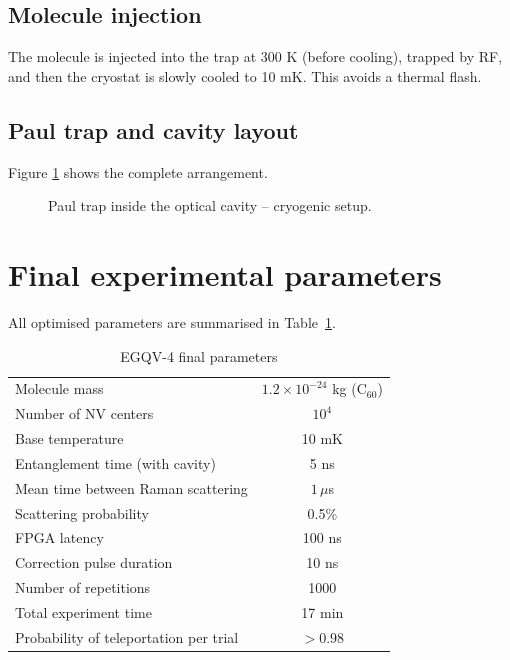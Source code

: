 \documentclass[12pt,a4paper]{article}
\begin{document}
\subsection{Molecule injection}
The molecule is injected into the trap at 300 K (before cooling), trapped by RF, and then the cryostat is slowly cooled to 10 mK. This avoids a thermal flash.

\subsection{Paul trap and cavity layout}
Figure \ref{fig:setup} shows the complete arrangement.

\begin{figure}[h]
\centering
{}
\caption{Paul trap inside the optical cavity – cryogenic setup.}
\label{fig:setup}
\end{figure}

\section{Final experimental parameters}
All optimised parameters are summarised in Table~\ref{tab:params}.

\begin{table}[h]
\centering
\caption{EGQV-4 final parameters}
\label{tab:params}
\begin{tabular}{|l|c|}
\hline
Molecule mass & $1.2\times10^{-24}$ kg (C$_{60}$) \\
Number of NV centers & $10^4$ \\
Base temperature & 10 mK \\
Entanglement time (with cavity) & 5 ns \\
Mean time between Raman scattering & $1\,\mu$s \\
Scattering probability & 0.5\% \\
FPGA latency & 100 ns \\
Correction pulse duration & 10 ns \\
Number of repetitions & 1000 \\
Total experiment time & 17 min \\
Probability of teleportation per trial & $>0.98$ \\
\hline
\end{tabular}
\end{table}
\end{document}
